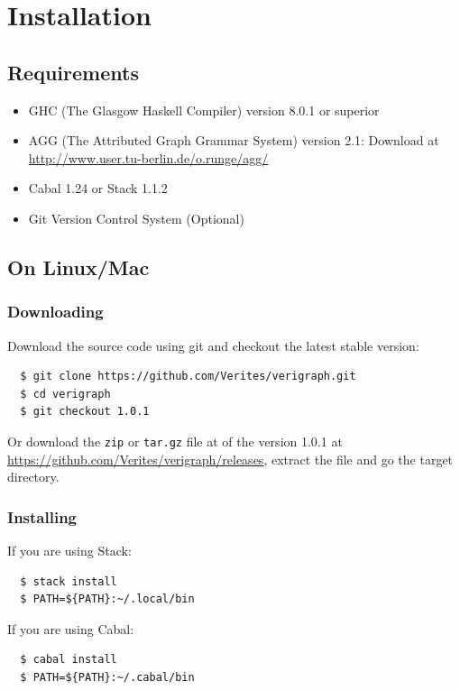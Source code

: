 \documentclass[12pt]{article}
\begin{document}
\pagebreak

\section{Installation}

\subsection{Requirements}
\begin{itemize}
\item GHC (The Glasgow Haskell Compiler) version 8.0.1 or superior
\item AGG (The Attributed Graph Grammar System) version 2.1: Download at \url{http://www.user.tu-berlin.de/o.runge/agg/}
\item Cabal 1.24 or Stack 1.1.2
\item Git Version Control System (Optional)
\end{itemize}

\subsection{On Linux/Mac}

\subsubsection{Downloading}
Download the source code using git and checkout the latest stable version:
\begin{verbatim}
  $ git clone https://github.com/Verites/verigraph.git
  $ cd verigraph
  $ git checkout 1.0.1
\end{verbatim}

\noindent
Or download the \texttt{zip} or \texttt{tar.gz} file at of the version 1.0.1 at \url{https://github.com/Verites/verigraph/releases}, extract the file and go the target directory.

\subsubsection{Installing}

If you are using Stack:
\begin{verbatim}
  $ stack install
  $ PATH=${PATH}:~/.local/bin
\end{verbatim}

\noindent
If you are using Cabal:
\begin{verbatim}
  $ cabal install
  $ PATH=${PATH}:~/.cabal/bin
\end{verbatim}
\end{document}
